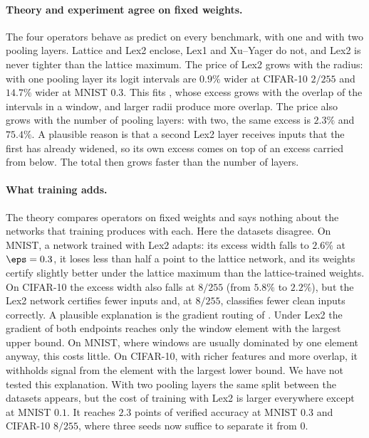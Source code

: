 \paragraph{Theory and experiment agree on fixed weights.} The four operators behave as  predict on every benchmark, with one and with two pooling layers. Lattice and Lex2 enclose, Lex1 and Xu--Yager do not, and Lex2 is never tighter than the lattice maximum. The price of Lex2 grows with the radius: with one pooling layer its logit intervals are $0.9\%$ wider at CIFAR-10 $2/255$ and $14.7\%$ wider at MNIST $0.3$. This fits , whose excess grows with the overlap of the intervals in a window, and larger radii produce more overlap. The price also grows with the number of pooling layers: with two, the same excess is $2.3\%$ and $75.4\%$. A plausible reason is that a second Lex2 layer receives inputs that the first has already widened, so its own excess comes on top of an excess carried from below. The total then grows faster than the number of layers.

\paragraph{What training adds.} The theory compares operators on fixed weights and says nothing about the networks that training produces with each. Here the datasets disagree. On MNIST, a network trained with Lex2 adapts: its excess width falls to $2.6\%$ at $\eps=0.3$, it loses less than half a point to the lattice network, and its weights certify slightly better under the lattice maximum than the lattice-trained weights. On CIFAR-10 the excess width also falls at $8/255$ (from $5.8\%$ to $2.2\%$), but the Lex2 network certifies fewer inputs and, at $8/255$, classifies fewer clean inputs correctly. A plausible explanation is the gradient routing of . Under Lex2 the gradient of both endpoints reaches only the window element with the largest upper bound. On MNIST, where windows are usually dominated by one element anyway, this costs little. On CIFAR-10, with richer features and more overlap, it withholds signal from the element with the largest lower bound. We have not tested this explanation. With two pooling layers the same split between the datasets appears, but the cost of training with Lex2 is larger everywhere except at MNIST $0.1$. It reaches $2.3$ points of verified accuracy at MNIST $0.3$ and CIFAR-10 $8/255$, where three seeds now suffice to separate it from $0$.

